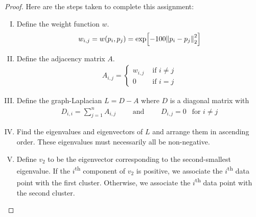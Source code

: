 \documentclass{article} %
\theoremstyle{plain}
\numberwithin{equation}{section} %
\numberwithin{figure}{section} %
\numberwithin{table}{section} %
\begin{document}
\begin{proof}
    Here are the steps taken to complete this assignment:
    \begin{enumerate}[I.]
        \item
            Define the weight function $w$.
            \begin{align*}
                w_{i,j} = w(p_i, p_j) = \exp[-100\norm{p_i - p_j}_2^2]
            \end{align*}
        \item
            Define the adjacency matrix $A$.
            \begin{align*}
                A_{i,j} = \begin{cases}
                    w_{i,j} & \text{ if } i \neq j \\
                    0 & \text{ if } i = j
                \end{cases}
            \end{align*}
        \item
            Define the graph-Laplacian $L = D - A$ where $D$ is a diagonal matrix with
            \begin{align*}
                D_{i,i} = \sum_{j=1}^n A_{i,j} \qquad \text{ and } \qquad D_{i,j} = 0\ \ \text{ for } i \neq j
            \end{align*}
        \item
            Find the eigenvalues and eigenvectors of $L$ and arrange them in ascending order.  These eigenvalues must necessarily all be non-negative.
        \item
            Define $v_2$ to be the eigenvector corresponding to the second-smallest eigenvalue.  If the $i$\textsuperscript{th} component of $v_2$ is positive, we associate the $i$\textsuperscript{th} data point with the first cluster.  Otherwise, we associate the $i$\textsuperscript{th} data point with the second cluster.
    \end{enumerate}
\end{proof}
\end{document}
